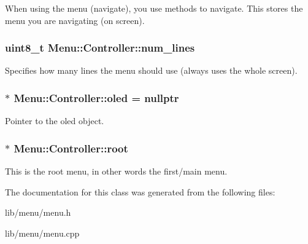 When using the menu (navigate), you use methods to navigate. This stores the menu you are navigating (on screen). \hypertarget{class_menu_1_1_controller_a80d614a66d1ffa2612688776842f1f31}{
\subsubsection[{num\-\_\-lines}]{\setlength{\rightskip}{0pt plus 5cm}uint8\-\_\-t Menu\-::\-Controller\-::num\-\_\-lines\hspace{0.3cm}{\ttfamily [private]}}}\label{class_menu_1_1_controller_a80d614a66d1ffa2612688776842f1f31}
Specifies how many lines the menu should use (always uses the whole screen). \hypertarget{class_menu_1_1_controller_aaa0388123d9e3bb0d4f546336e2b502d}{
\subsubsection[{oled}]{$\ast$ Menu\-::\-Controller\-::oled = nullptr\hspace{0.3cm}{\ttfamily [private]}}}\label{class_menu_1_1_controller_aaa0388123d9e3bb0d4f546336e2b502d}
Pointer to the oled object. \hypertarget{class_menu_1_1_controller_a211b6de05f7eed25f3a7f504c42316e0}{
\subsubsection[{root}]{$\ast$ Menu\-::\-Controller\-::root\hspace{0.3cm}{\ttfamily [private]}}}\label{class_menu_1_1_controller_a211b6de05f7eed25f3a7f504c42316e0}
This is the root menu, in other words the first/main menu. 

The documentation for this class was generated from the following files\-:\begin{DoxyCompactItemize}
\item 
lib/menu/menu.\-h\item 
lib/menu/menu.\-cpp\end{DoxyCompactItemize}
